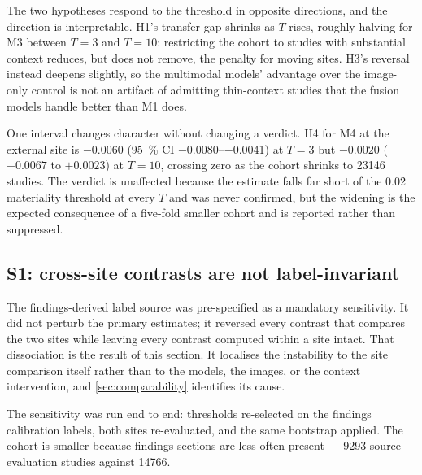 The two hypotheses respond to the threshold in opposite directions, and the
direction is interpretable. H1's transfer gap shrinks as $T$ rises, roughly
halving for M3 between $T = 3$ and $T = 10$: restricting the cohort to studies
with substantial context reduces, but does not remove, the penalty for moving
sites. H3's reversal instead deepens slightly, so the multimodal models'
advantage over the image-only control is not an artifact of admitting
thin-context studies that the fusion models handle better than M1 does.

One interval changes character without changing a verdict. H4 for M4 at the
external site is $-0.0060$ (\SI{95}{\percent} CI \numrange{-0.0080}{-0.0041}) at
$T = 3$ but $-0.0020$ ($-0.0067$ to $+0.0023$) at $T = 10$, crossing zero as the
cohort shrinks to \num{23146} studies. The verdict is unaffected because the
estimate falls far short of the \num{0.02} materiality threshold at every $T$
and was never confirmed, but the widening is the expected consequence of a
five-fold smaller cohort and is reported rather than suppressed.

\subsection{S1: cross-site contrasts are not label-invariant}
\label{sec:s1}

The findings-derived label source was pre-specified as a mandatory sensitivity.
It did not perturb the primary estimates; it reversed every contrast that
compares the two sites while leaving every contrast computed within a site
intact. That dissociation is the result of this section. It localises the
instability to the site comparison itself rather than to the models, the
images, or the context intervention, and \cref{sec:comparability} identifies
its cause.

The sensitivity was run end to end: thresholds re-selected on the findings
calibration labels, both sites re-evaluated, and the same bootstrap applied. The
cohort is smaller because findings sections are less often present ---
\num{9293} source evaluation studies against \num{14766}.

